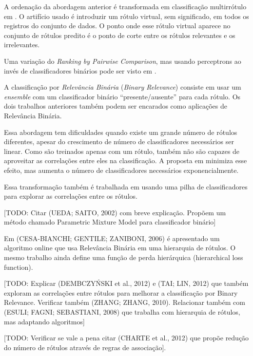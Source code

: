 \documentclass[runningheads,a4paper]{llncs}
\begin{document}
A ordenação da abordagem anterior é transformada em classificação multirrótulo em \cite{Furnkranz2008-rf}. O artifício usado é introduzir um rótulo virtual, sem significado, em todos os registros do conjunto de dados. O ponto onde esse rótulo virtual aparece no conjunto de rótulos predito é o ponto de corte entre os rótulos relevantes e os irrelevantes.

Uma variação do \textit{Ranking by Pairwise Comparison}, mas usando perceptrons ao invés de classificadores binários pode ser visto em \cite{Mencia2008-rh}.

A classificação por \emph{Relevância Binária} (\textit{Binary Relevance}) consiste em usar um \textit{ensemble} com um classificador binário “presente/ausente” para cada rótulo. Os dois trabalhos anteriores também podem ser encarados como aplicações de Relevância Binária.

Essa abordagem tem dificuldades quando existe um grande número de rótulos diferentes, apesar do crescimento de número de classificadores necessários ser linear. Como são treinados apenas com um rótulo, também não são capazes de aproveitar as correlações entre eles na classificação. A proposta em \cite{Hullermeier2008-co} minimiza esse efeito, mas aumenta o número de classificadores necessários exponencialmente.

Essa transformação também é trabalhada em \cite{Tsoumakas2009-ex} usando uma pilha de classificadores para explorar as correlações entre os rótulos.

[TODO: Citar (UEDA; SAITO, 2002)\cite{Ueda2002-gd} com breve explicação. Propõem um método chamado Parametric Mixture Model para classificador binário]

Em (CESA-BIANCHI; GENTILE; ZANIBONI, 2006) \cite{Cesa-Bianchi2006-fk} é apresentado um algoritmo online que usa Relevância Binária em uma hierarquia de rótulos. O mesmo trabalho ainda define uma função de perda hierárquica (hierarchical loss function).

[TODO: Explicar (DEMBCZYŃSKI et al., 2012)\cite{Dembczynski2012-tv} e (TAI; LIN, 2012)\cite{Tai2012-xa} que também exploram as correlações entre rótulos para melhorar a classificação por Binary Relevance. Verificar também (ZHANG; ZHANG, 2010)\cite{Zhang2010-ee}. Relacionar também com (ESULI; FAGNI; SEBASTIANI, 2008) \cite{Esuli2008-on} que trabalha com hierarquia de rótulos, mas adaptando algoritmos]

[TODO: Verificar se vale a pena citar (CHARTE et al., 2012)\cite{Charte2012-tw} que propõe redução do número de rótulos através de regras de associação].
\end{document}
